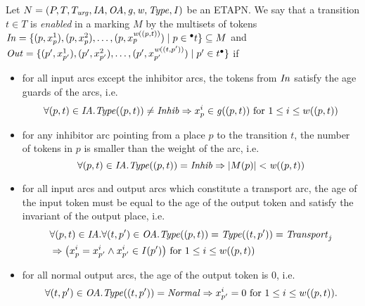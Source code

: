 \begin{definition}[Enabledness]
\label{def:enabledness}
 Let $N = (P, T, T_{\mathit{urg}}, \mathit{IA},\allowbreak \mathit{OA}, \mathit{g}, \mathit{w}, \mathit{Type}, \mathit{I})$ be an ETAPN. 
We say that a transition $t \in T$ is \emph{enabled} in a marking $M$ by the 
multisets of tokens
$\mathit{In} = \{(p,x_{p}^1), (p,x_{p}^2), \dots ,(p,x_{p}^{\mathit{w} ((p,t))})\mid 
p \in {}^\bullet t\} \subseteq M$ and 
$\mathit{Out} = \{ (p^{\prime},x_{p^{\prime}}^1),
           (p^{\prime},x_{p^{\prime}}^2),
\dots ,\allowbreak
(p^{\prime},x_{p^{\prime}}^{\mathit{w} ((t,p^{\prime}))}) 
\mid p^{\prime} \in t^\bullet \}$ if
\begin{itemize}
\item for all input arcs except the inhibitor arcs, the tokens from $\mathit{In}$ satisfy the age guards of the arcs, i.e. 
$$\forall(p,t) \in \mathit{IA}. \mathit{Type}((p,t)) \neq \mathit{Inhib} \Rightarrow  x_p^i \in \mathit{g}((p,t))\text{ for }1\leq i\leq w((p,t)) $$ 
\item for any inhibitor arc pointing from a place $p$ to the
transition $t$, the number of tokens in $p$ is smaller than the weight of the arc, i.e.
$$\forall(p,t) \in \mathit{IA}. \mathit{Type}((p,t)) = \mathit{Inhib} \Rightarrow|M(p)|<\mathit{w} ((p,t))$$ 
\item for all input arcs and output arcs which constitute a transport arc, 
the age of the input token must be equal to the age of the output token and satisfy the invariant of the output place, i.e.
\begin{eqnarray*}
&\forall(p,t) \in \mathit{IA}. \forall(t,p^{\prime}) \in \mathit{OA}.\mathit{Type}((p,t)) = \mathit{Type}((t,p^{\prime})) 
= \mathit{Transport}_j \\
&\Rightarrow \big( x_p^i = x_{p^{\prime}}^i \wedge x_{p^{\prime}}^i \in 
\mathit{I}(p^{\prime})\big) \text{ for } 1\leq i \leq w((p,t))
\end{eqnarray*}
\item for all normal output arcs, the age of the output token is $0$, i.e. $$\forall(t,p^{\prime}) \in \mathit{OA}. \mathit{Type}((t,p^{\prime})) = \mathit{Normal} \Rightarrow x_{p^{\prime}}^i = 0 \text{ for }1\leq i \leq w((p,t)).$$ 
\end{itemize}
\end{definition}

